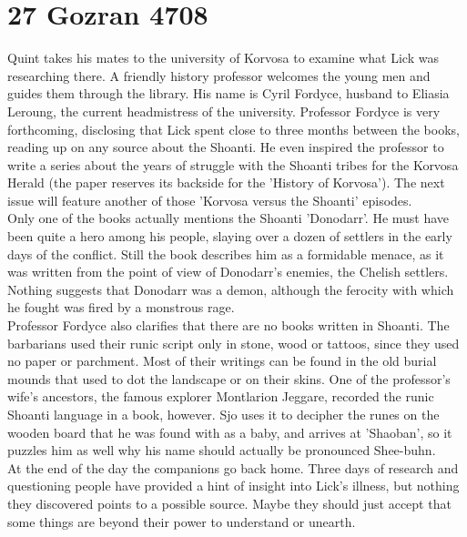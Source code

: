 \section{27 Gozran 4708}

Quint takes his mates to the university of Korvosa to examine what Lick was researching there. A friendly history professor welcomes the young men and guides them through the library. His name is Cyril Fordyce, husband to Eliasia Leroung, the current headmistress of the university. Professor Fordyce is very forthcoming, disclosing that Lick spent close to three months between the books, reading up on any source about the Shoanti. He even inspired the professor to write a series about the years of struggle with the Shoanti tribes for the Korvosa Herald (the paper reserves its backside for the 'History of Korvosa'). The next issue will feature another of those 'Korvosa versus the Shoanti' episodes.\\

Only one of the books actually mentions the Shoanti 'Donodarr'. He must have been quite a hero among his people, slaying over a dozen of settlers in the early days of the conflict. Still the book describes him as a formidable menace, as it was written from the point of view of Donodarr's enemies, the Chelish settlers. Nothing suggests that Donodarr was a demon, although the ferocity with which he fought was fired by a monstrous rage.\\

Professor Fordyce also clarifies that there are no books written in Shoanti. The barbarians used their runic script only in stone, wood or tattoos, since they used no paper or parchment. Most of their writings can be found in the old burial mounds that used to dot the landscape or on their skins. One of the professor's wife's ancestors, the famous explorer Montlarion Jeggare, recorded the runic Shoanti language in a book, however. Sjo uses it to decipher the runes on the wooden board that he was found with as a baby, and arrives at 'Shaoban', so it puzzles him as well why his name should actually be pronounced Shee-buhn.\\

At the end of the day the companions go back home. Three days of research and questioning people have provided a hint of insight into Lick's illness, but nothing they discovered points to a possible source. Maybe they should just accept that some things are beyond their power to understand or unearth.\\

